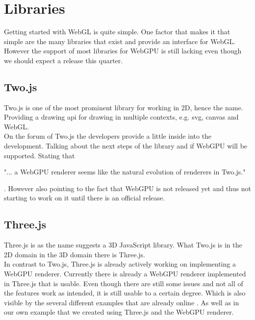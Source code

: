 %
%
% 
% 

\chapter{Libraries}

\label{chap:Libraries}

Getting started with WebGL is quite simple. 
One factor that makes it that simple are the many libraries that exist and provide an interface for WebGL.
However the support of most libraries for WebGPU is still lacking even though we should expect a release this quarter.

\section{Two.js}

Two.js is one of the most prominent library for working in 2D, hence the name.
Providing a drawing api for drawing in multiple contexts, e.g. svg, canvas and WebGL.\\
On the forum of Two.js the developers provide a little inside into the development.
Talking about the next steps of the library and if WebGPU will be supported.
Stating that \begin{displayquote} "... a WebGPU renderer seems like the natural evolution of renderers in Two.js." \end{displayquote}\parencite{two_quote}.
However also pointing to the fact that WebGPU is not released yet and thus not starting to work on it until there is an official release.

\section{Three.js}

Three.js is as the name suggests a 3D JavaScript library. 
What Two.js is in the 2D domain in the 3D domain there is Three.js.\\
In contrast to Two.js, Three.js is already actively working on implementing a WebGPU renderer.
Currently there is already a WebGPU renderer implemented in Three.js that is usable. 
Even though there are still some issues and not all of the features work as intended, it is still usable to a certain degree.
Which is also visible by the several different examples that are already online \parencite{three_examples}.
As well as in our own example that we created using Three.js and the WebGPU renderer. \\

